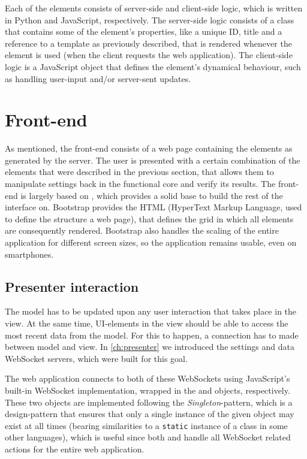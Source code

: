 \documentclass[a4paper, openany, oneside]{memoir}
\begin{document}
Each of the elements consists of server-side and client-side logic, which is written in Python and JavaScript, respectively. The server-side logic consists of a class that contains some of the element's properties, like a unique ID, title and a reference to a  template as previously described, that is rendered whenever the element is used (when the client requests the web application). The client-side logic is a JavaScript object that defines the element's dynamical behaviour, such as handling user-input and/or server-sent updates.

\section{Front-end}
\label{sec:clientside}
As mentioned, the front-end consists of a web page containing the elements as generated by the server. The user is presented with a certain combination of the elements that were described in the previous section, that allows them to manipulate settings back in the functional core and verify its results. The front-end is largely based on , which provides a solid base to build the rest of the interface on. Bootstrap provides the HTML (HyperText Markup Language, used to define the structure a web page), that defines the grid in which all elements are consequently rendered. Bootstrap also handles the scaling of the entire application for different screen sizes, so the application remains usable, even on smartphones.

\subsection{Presenter interaction}
\label{sub:presenter_interaction}
The model has to be updated upon any user interaction that takes place in the view. At the same time, UI-elements in the view should be able to access the most recent data from the model. For this to happen, a connection has to made between model and view. In \cref{ch:presenter} we introduced the settings and data WebSocket servers, which were built for this goal.

The web application connects to both of these WebSockets using JavaScript's built-in WebSocket implementation, wrapped in the  and  objects, respectively. These two objects are implemented following the \emph{Singleton}-pattern, which is a design-pattern that ensures that only a single instance of the given object may exist at all times (bearing similarities to a \texttt{static} instance of a class in some other languages), which is useful since both  and  handle all WebSocket related actions for the entire web application.
\end{document}
